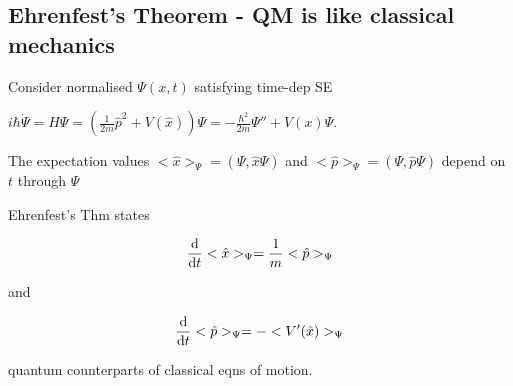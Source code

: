 \documentclass[a4paper]{article}
\begin{document}
\subsection{Ehrenfest's Theorem - QM is like classical mechanics}
	
Consider normalised $ \Psi(x,t) $ satisfying time-dep SE

$ i \hbar \dot{\Psi} = H \Psi = \left(  \frac{1}{2m} \hat{p}^{2} + V (\hat{x}) \right) \Psi = - \frac{\hbar^{2}}{2m} \Psi'' + V(x) \Psi  $.

The expectation values $ <\hat{x}>_{\Psi} = (\Psi, \hat{x} \Psi) $ and $  <\hat{p}>_{\Psi} = (\Psi, \hat{p} \Psi) $ depend on $ t $ through $ \Psi $

Ehrenfest's Thm states

\[ \frac{\mathrm{d} }{\mathrm{d} t}  <\hat{x}>_{\Psi} = \frac{1}{m} <\hat{p}>_{\Psi} \]

and

\[ \frac{\mathrm{d} }{\mathrm{d} t}  <\hat{p}>_{\Psi} = - <V'(\hat{x})>_{\Psi} \]
	
quantum counterparts of classical eqns of motion.
\end{document}
